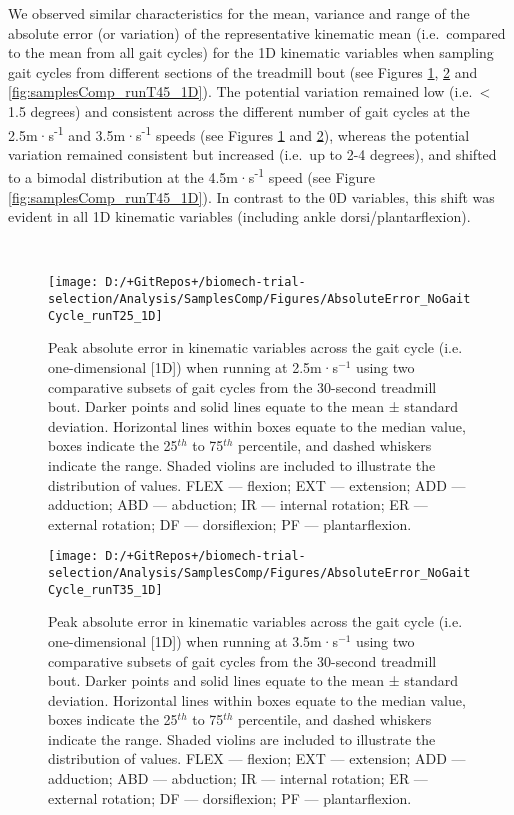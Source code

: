 \documentclass[]{elsarticle} %
\begin{document}
We observed similar characteristics for the mean, variance and range of
the absolute error (or variation) of the representative kinematic mean
(i.e.~compared to the mean from all gait cycles) for the 1D kinematic
variables when sampling gait cycles from different sections of the
treadmill bout (see Figures \ref{fig:samplesComp_runT25_1D},
\ref{fig:samplesComp_runT35_1D} and \ref{fig:samplesComp_runT45_1D}).
The potential variation remained low (i.e.~\textless{} 1.5 degrees) and
consistent across the different number of gait cycles at the
2.5m·s\textsuperscript{-1} and 3.5m·s\textsuperscript{-1} speeds (see
Figures \ref{fig:samplesComp_runT25_1D} and
\ref{fig:samplesComp_runT35_1D}), whereas the potential variation
remained consistent but increased (i.e.~up to 2-4 degrees), and shifted
to a bimodal distribution at the 4.5m·s\textsuperscript{-1} speed (see
Figure \ref{fig:samplesComp_runT45_1D}). In contrast to the 0D
variables, this shift was evident in all 1D kinematic variables
(including ankle dorsi/plantarflexion).

~

\begin{figure}

{\centering \texttt{[image: D:/+GitRepos+/biomech-trial-selection/Analysis/SamplesComp/Figures/AbsoluteError\_NoGaitCycle\_runT25\_1D]} 

}

\caption{Peak absolute error in kinematic variables across the gait cycle (i.e. one-dimensional [1D]) when running at 2.5m·s$^{-1}$ using two comparative subsets of gait cycles from the 30-second treadmill bout. Darker points and solid lines equate to the mean ± standard deviation. Horizontal lines within boxes equate to the median value, boxes indicate the 25$^{th}$ to 75$^{th}$ percentile, and dashed whiskers indicate the range. Shaded violins are included to illustrate the distribution of values. FLEX — flexion; EXT — extension; ADD — adduction; ABD — abduction; IR — internal rotation; ER — external rotation; DF — dorsiflexion; PF — plantarflexion.}\label{fig:samplesComp_runT25_1D}
\end{figure}

\begin{figure}

{\centering \texttt{[image: D:/+GitRepos+/biomech-trial-selection/Analysis/SamplesComp/Figures/AbsoluteError\_NoGaitCycle\_runT35\_1D]} 

}

\caption{Peak absolute error in kinematic variables across the gait cycle (i.e. one-dimensional [1D]) when running at 3.5m·s$^{-1}$ using two comparative subsets of gait cycles from the 30-second treadmill bout. Darker points and solid lines equate to the mean ± standard deviation. Horizontal lines within boxes equate to the median value, boxes indicate the 25$^{th}$ to 75$^{th}$ percentile, and dashed whiskers indicate the range. Shaded violins are included to illustrate the distribution of values. FLEX — flexion; EXT — extension; ADD — adduction; ABD — abduction; IR — internal rotation; ER — external rotation; DF — dorsiflexion; PF — plantarflexion.}\label{fig:samplesComp_runT35_1D}
\end{figure}
\end{document}

